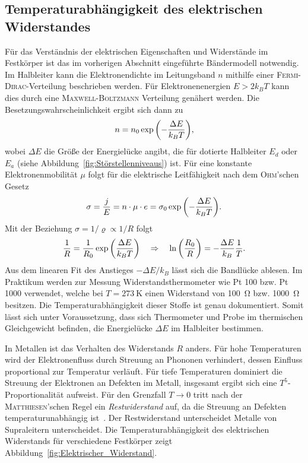 \documentclass[parskip=half, a4paper,twoside,final]{article}
\begin{document}
\subsection{Temperaturabhängigkeit des elektrischen Widerstandes}\label{sec:Widerstand}
Für das Verständnis der elektrischen Eigenschaften und Widerstände im Festkörper ist das im vorherigen Abschnitt eingeführte Bändermodell notwendig. Im Halbleiter kann die Elektronendichte im Leitungsband $n$ mithilfe einer \textsc{Fermi-Dirac}-Verteilung beschrieben werden. Für Elektronenenergien $E > 2k_B T$ kann dies durch eine \textsc{Maxwell-Boltzmann} Verteilung genähert werden. Die Besetzungswahrscheinlichkeit ergibt sich dann zu~\cite{Thurk}
\begin{align}
  n = n_0 \exp\qty(-\frac{\Delta E}{k_B T}),
\end{align}
wobei $\Delta E$ die Größe der Energielücke angibt, die für dotierte Halbleiter $E_d$ oder $E_a$ (siehe Abbildung~\ref{fig:Störstellenniveaus}) ist.
Für eine konstante Elektronenmobilität $\mu$ folgt für die elektrische Leitfähigkeit nach dem \textsc{Ohm}'schen Gesetz~\cite{Thurk}
\begin{align}
  \sigma = \frac{j}{E} = n \cdot \mu \cdot e = \sigma_0 \exp\qty(-\frac{\Delta E}{k_B T}).
\end{align}
Mit der Beziehung $\sigma = 1/\varrho \propto 1/R$ folgt
\begin{align}\label{eqn:Anstieg_Bandlücke}
  \frac{1}{R} = \frac{1}{R_0} \exp\qty(\frac{\Delta E}{k_B T}) \quad \Rightarrow \quad \ln\qty(\frac{R_0}{R}) = -\frac{\Delta E}{k_B}\frac{1}{T}.
\end{align}
Aus dem linearen Fit des Anstieges $-\Delta E/k_B$ lässt sich die Bandlücke ablesen. Im Praktikum werden zur Messung Widerstandsthermometer wie Pt 100 bzw. Pt 1000 verwendet, welche bei $T = \SI{273}{\kelvin}$ einen Widerstand von \SI{100}{\ohm} bzw. \SI{1000}{\ohm} besitzen. Die Temperaturabhängigkeit dieser Stoffe ist genau dokumentiert. Somit lässt sich unter Voraussetzung, dass sich Thermometer und Probe im thermischen Gleichgewicht befinden, die Energielücke $\Delta E$ im Halbleiter bestimmen.

In Metallen ist das Verhalten des Widerstands $R$ anders. Für hohe Temperaturen wird der Elektronenfluss durch Streuung an Phononen verhindert, dessen Einfluss proportional zur Temperatur verläuft. Für tiefe Temperaturen dominiert die Streuung der Elektronen an Defekten im Metall, insgesamt ergibt sich eine $T^5$-Proportionalität aufweist. Für den Grenzfall $T \to 0$ tritt nach der \textsc{Matthiesen}'schen Regel ein \emph{Restwiderstand} auf, da die Streuung an Defekten temperaturunabhängig ist~\cite{Hunklinger}. Der Restwiderstand unterscheidet Metalle von Supraleitern unterscheidet. Die Temperaturabhängigkeit des elektrischen Widerstands für verschiedene Festkörper zeigt Abbildung~\ref{fig:Elektrischer_Widerstand}.
\end{document}
